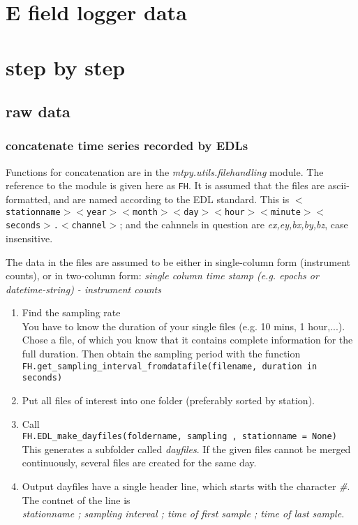 \section{E field logger data}
\label{sec:processing.elogger}

\section{step by step}

\subsection{raw data}

\subsubsection{concatenate time series recorded by EDLs}

Functions for concatenation are in the \textit{mtpy.utils.filehandling} module. The reference to the module is given here as   \texttt{FH}. It is assumed that the files are ascii-formatted, and are named according to the EDL standard. This is \texttt{$<$stationname$>$$<$year$>$$<$month$>$$<$day$>$$<$hour$>$$<$minute$>$$<$seconds$>$.$<$channel$>$}; and the cahnnels in question are \textit{ex,ey,bx,by,bz}, case insensitive.

The data in the files are assumed to be either in single-column form (instrument counts), or in two-column form: \textit{single column time stamp (e.g. epochs or datetime-string) - instrument counts}

\begin{enumerate}
\item Find the sampling rate{~}\\
You have to know the duration of your single files (e.g. 10 mins, 1 hour,...). Chose a file, of which you know that it contains complete information for the full duration. Then obtain the sampling period with the function \\
\texttt{FH.get\_sampling\_interval\_fromdatafile(filename, duration in seconds)}

\item Put all files of interest into one folder (preferably sorted by station).

\item Call \\
\texttt{FH.EDL\_make\_dayfiles(foldername, sampling , stationname = None)}\\ This generates a subfolder called \textit{dayfiles}. If the given files cannot be merged continuously, several files are created for the same day.

\item Output dayfiles have a single header line, which starts with the character \textit{\#}. The contnet of the line is \\  \textit{stationname ; sampling interval ; time of first sample ; time of last sample}.

\end{enumerate}


